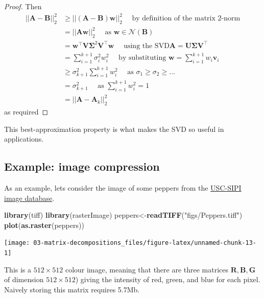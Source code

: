 \documentclass[]{book}
\newenvironment{Shaded}{\begin{snugshade}}{\end{snugshade}}
\newcommand{\KeywordTok}[1]{\textcolor[rgb]{0.13,0.29,0.53}{\textbf{#1}}}
\newcommand{\NormalTok}[1]{#1}
\newcommand{\StringTok}[1]{\textcolor[rgb]{0.31,0.60,0.02}{#1}}
\theoremstyle{definition}
\theoremstyle{definition}
\theoremstyle{definition}
\theoremstyle{remark}
\begin{document}
\begin{proof}
Then
\begin{align*}
||\boldsymbol A-\boldsymbol B||_2^2 &\geq ||(\boldsymbol A-\boldsymbol B)\boldsymbol w||_{2}^2 \quad \mbox{ by definition of the matrix 2-norm}\\
&=||\boldsymbol A\boldsymbol w||_2^2 \quad \mbox{ as } \boldsymbol w\in \mathcal{N}(\boldsymbol B)\\
&=\boldsymbol w^\top \boldsymbol V\boldsymbol \Sigma^2\boldsymbol V^\top \boldsymbol w\quad\mbox{ using the SVD} \boldsymbol A=\boldsymbol U\boldsymbol \Sigma\boldsymbol V^\top\\
&=\sum_{i=1}^{k+1}\sigma_i^2 w_i^2 \quad\mbox{ by substituting }\boldsymbol w= \sum_{i=1}^{k+1}w_i \boldsymbol v_i\\
&\geq \sigma_{k+1}^2 \sum_{i=1}^{k+1} w_i^2\quad\mbox{ as } \sigma_1\geq\sigma_2\geq\ldots\\
&= \sigma_{k+1}^2 \quad\mbox{ as } \sum_{i=1}^{k+1}w_i^2=1\\
&=||\boldsymbol A-\boldsymbol A_k||_2^2
\end{align*}
as required
\end{proof}

This best-approximation property is what makes the SVD so useful in applications.

\hypertarget{example-image-compression}{%
\subsection{Example: image compression}\label{example-image-compression}}

As an example, lets consider the image of some peppers from the \href{http://sipi.usc.edu/database/}{USC-SIPI image database}.

\begin{Shaded}
\begin{Highlighting}[]
\KeywordTok{library}\NormalTok{(tiff)}
\KeywordTok{library}\NormalTok{(rasterImage)}
\NormalTok{peppers<-}\KeywordTok{readTIFF}\NormalTok{(}\StringTok{"figs/Peppers.tiff"}\NormalTok{)}
\KeywordTok{plot}\NormalTok{(}\KeywordTok{as.raster}\NormalTok{(peppers))}
\end{Highlighting}
\end{Shaded}

\texttt{[image: 03-matrix-decompositions\_files/figure-latex/unnamed-chunk-13-1]}

This is a \(512 \times 512\) colour image, meaning that there are three matrices \(\boldsymbol R, \boldsymbol B,\boldsymbol G\) of dimension \(512\times 512\)) giving the intensity of red, green, and blue for each pixel.
Naively storing this matrix requires 5.7Mb.
\end{document}
